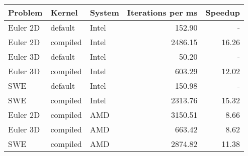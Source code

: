 \begin{tabular}{lllrr}
\toprule
Problem & Kernel & System & Iterations per ms & Speedup \\
\midrule
Euler 2D & default & Intel & 152.90 & - \\
Euler 2D & compiled & Intel & 2486.15 & 16.26 \\
Euler 3D & default & Intel & 50.20 & - \\
Euler 3D & compiled & Intel & 603.29 & 12.02 \\
SWE & default & Intel & 150.98 & - \\
SWE & compiled & Intel & 2313.76 & 15.32 \\
Euler 2D & compiled & AMD & 3150.51 & 8.66 \\
Euler 3D & compiled & AMD & 663.42 & 8.62 \\
SWE & compiled & AMD & 2874.82 & 11.38 \\
\bottomrule
\end{tabular}
